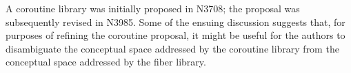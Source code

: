 A coroutine library was initially proposed in N3708\cite{n3708}; the proposal was
subsequently revised in N3985\cite{n3985}. Some of the ensuing discussion suggests that,
for purposes of refining the coroutine proposal, it might be useful for the
authors to disambiguate the conceptual space addressed by the coroutine
library from the conceptual space addressed by the fiber library.
